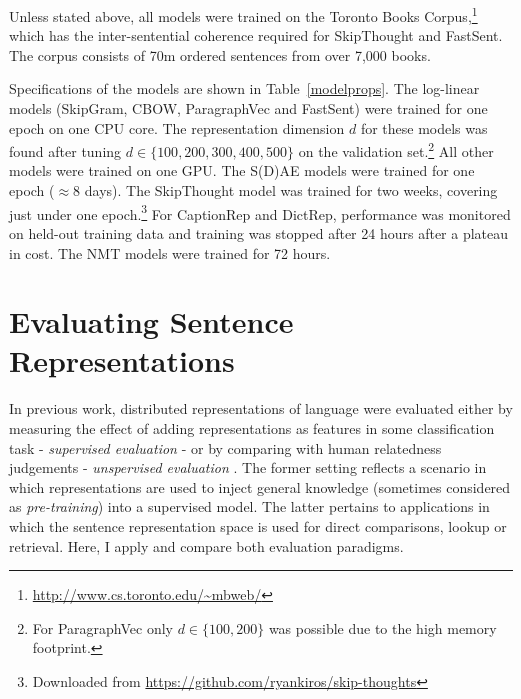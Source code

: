 Unless stated above, all models were trained on the Toronto Books Corpus,\footnote{\scriptsize \url{http://www.cs.toronto.edu/~mbweb/}} which has the inter-sentential coherence required for SkipThought and FastSent. The corpus consists of 70m ordered sentences from over 7,000 books. 

Specifications of the models are shown in Table~\ref{modelprops}. The log-linear models (SkipGram, CBOW, ParagraphVec and FastSent) were trained for one epoch on one CPU core. The representation dimension \(d\) for these models was found after tuning \(d \in \{100,200,300,400,500\}\) on the validation set.\footnote{For ParagraphVec only \(d \in\{100,200\}\) was possible due to the high memory footprint.} All other models were trained on one GPU. The S(D)AE models were trained for one epoch (\(\approx8\) days). The SkipThought model was trained for two weeks, covering just under one epoch.\footnote{Downloaded from {\scriptsize \url{https://github.com/ryankiros/skip-thoughts}}} For CaptionRep and DictRep, performance was monitored on held-out training data and training was stopped after 24 hours after a plateau in cost. The NMT models were trained for 72 hours. 

\section{Evaluating Sentence Representations}

In previous work, distributed representations of language were evaluated either by measuring the effect of adding representations as features in some classification task - \emph{supervised evaluation} \citep{collobert2011natural,mikolov2013efficient,kiros2015skip} - or by comparing with human relatedness judgements - \emph{unspervised evaluation} \citep{hill2015learning,baroni2014don,levy2015improving}. The former setting reflects a scenario in which representations are used to inject general knowledge (sometimes considered as \emph{pre-training}) into a supervised model. The latter pertains to applications in which the sentence representation space is used for direct comparisons, lookup or retrieval. Here, I apply and compare both evaluation paradigms.  


